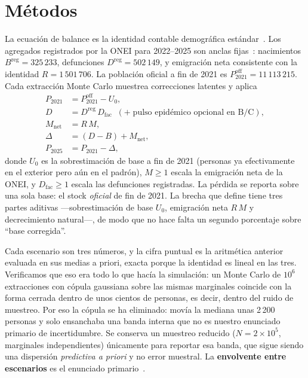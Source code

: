 \documentclass[11pt,a4paper]{article}
\begin{document}
\section{Métodos}

La ecuación de balance es la identidad contable demográfica estándar~\citep{preston2001}.
Los agregados registrados por la ONEI para 2022--2025 son anclas fijas~\citep{onei_2025}:
nacimientos $B^{\mathrm{reg}}=325\,233$, defunciones $D^{\mathrm{reg}}=502\,149$,
y emigración neta consistente con la identidad $R=1\,501\,706$.
La población oficial a fin de 2021 es $P^{\mathrm{off}}_{2021}=11\,113\,215$.
Cada extracción Monte Carlo muestrea correcciones latentes y aplica
\begin{align}
P_{2021} &= P^{\mathrm{off}}_{2021} - U_0, \\
D &= D^{\mathrm{reg}}\,D_{\mathrm{fac}} \;\;(+\;\text{pulso epidémico opcional en B/C}), \\
M_{\mathrm{net}} &= R\,M, \\
\Delta &= (D - B) + M_{\mathrm{net}}, \\
P_{2025} &= P_{2021} - \Delta,
\end{align}
donde $U_0$ es la sobrestimación de base a fin de 2021 (personas ya efectivamente en el exterior pero aún en el padrón),
$M\ge 1$ escala la emigración neta de la ONEI, y $D_{\mathrm{fac}}\ge 1$ escala las defunciones registradas.
La pérdida se reporta sobre una sola base: el stock \emph{oficial} de fin de 2021.
La brecha que define tiene tres partes aditivas ---sobrestimación de base $U_0$, emigración neta $R\,M$ y decrecimiento natural---, de modo que no hace falta un segundo porcentaje sobre ``base corregida''.

Cada escenario son tres números, y la cifra puntual es la aritmética anterior evaluada en sus medias a priori, exacta porque la identidad es lineal en las tres.
Verificamos que eso era todo lo que hacía la simulación: un Monte Carlo de $10^6$ extracciones con cópula gaussiana sobre las mismas marginales coincide con la forma cerrada dentro de unos cientos de personas, es decir, dentro del ruido de muestreo.
Por eso la cópula se ha eliminado: movía la mediana unas 2\,200 personas y solo ensanchaba una banda interna que no es nuestro enunciado primario de incertidumbre.
Se conserva un muestreo reducido ($N=2\times10^5$, marginales independientes) únicamente para reportar esa banda, que sigue siendo una dispersión \emph{predictiva a priori} y no error muestral.
La \textbf{envolvente entre escenarios} es el enunciado primario~\citep{repo,modeld}.
\end{document}
